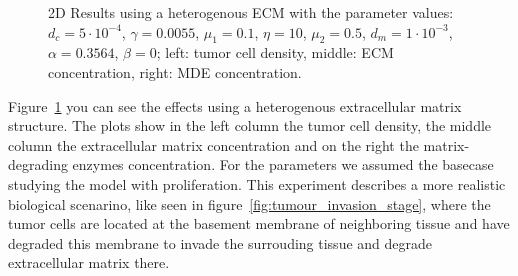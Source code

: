 \begin{figure}[h]
    \centering
    \caption{2D Results using a heterogenous ECM with the parameter values: $d_c=5\cdot 10^{-4}$, $\gamma=0.0055$, $\mu_1 = 0.1$, $\eta=10$, $\mu_2=0.5$, $d_m = 1\cdot 10^{-3}$, $\alpha = 0.3564$, $\beta = 0$; left: tumor cell density, middle: ECM concentration, right: MDE concentration.}
    \label{fig:2D_heterogenous_ECM}
\end{figure}
Figure~\ref{fig:2D_heterogenous_ECM} you can see the effects using a heterogenous extracellular matrix structure. The plots show in the left column the tumor cell density, the middle column the extracellular matrix concentration and on the right the matrix-degrading enzymes concentration. For the parameters we assumed the basecase studying the model with proliferation. \newline
This experiment describes a more realistic biological scenarino, like seen in figure~\ref{fig:tumour_invasion_stage}, where the tumor cells are located at the basement membrane of neighboring tissue and have degraded this membrane to invade the surrouding tissue and degrade extracellular matrix there.\newline
